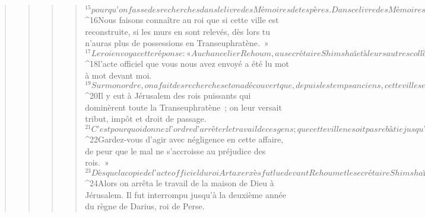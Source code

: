 \begin{verse}
\begin{verse}
\begin{verse}
\begin{verse}
${}^{15}pour qu’on fasse des recherches dans le livre des Mémoires de tes pères. Dans ce livre des Mémoires, tu trouveras et tu apprendras que cette ville est une ville rebelle, qu’elle porte préjudice aux rois et aux provinces, et que depuis les temps anciens on y a fomenté des révoltes. C’est à cause de cela que cette ville a été détruite. 
${}^{16}Nous faisons connaître au roi que si cette ville est reconstruite, si les murs en sont relevés, dès lors tu n’auras plus de possessions en Transeuphratène. »
${}^{17}Le roi envoya cette réponse : « Au chancelier Rehoum, au secrétaire Shimshaï et à leurs autres collègues qui habitent à Samarie et dans le reste de la Transeuphratène : Paix ! Maintenant donc, 
${}^{18}l’acte officiel que vous nous avez envoyé a été lu mot à mot devant moi. 
${}^{19}Sur mon ordre, on a fait des recherches et on a découvert que, depuis les temps anciens, cette ville se soulève contre les rois et qu’elle est travaillée par la révolte et la sédition. 
${}^{20}Il y eut à Jérusalem des rois puissants qui dominèrent toute la Transeuphratène ; on leur versait tribut, impôt et droit de passage. 
${}^{21}C’est pourquoi donnez l’ordre d’arrêter le travail de ces gens ; que cette ville ne soit pas rebâtie jusqu’à ce que j’en aie donné l’ordre. 
${}^{22}Gardez-vous d’agir avec négligence en cette affaire, de peur que le mal ne s’accroisse au préjudice des rois. »
${}^{23}Dès que la copie de l’acte officiel du roi Artaxerxès fut lue devant Rehoum et le secrétaire Shimshaï ainsi que leurs collègues, ils allèrent en toute hâte à Jérusalem auprès des Juifs et ils leur firent arrêter le travail par la force et la violence. 
${}^{24}Alors on arrêta le travail de la maison de Dieu à Jérusalem. Il fut interrompu jusqu’à la deuxième année du règne de Darius, roi de Perse.
      

\end{verse}
\end{verse}
\end{verse}
\end{verse}
